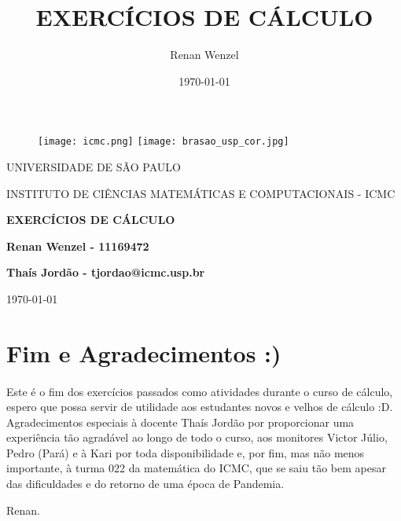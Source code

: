 \documentclass{article}
\title{EXERC\'ICIOS DE C\'ALCULO}
\author{Renan Wenzel}
\date{\today}
\begin{document}
\begin{figure}[ht]
		\texttt{[image: icmc.png]}
		\hspace{5cm}
		\texttt{[image: brasao\_usp\_cor.jpg]}
	\endminipage	
\end{figure}

\begin{center}
	\vspace{1cm}
	\LARGE
	UNIVERSIDADE DE S\~AO PAULO

	\vspace{1.3cm}
	\LARGE
	INSTITUTO DE CI\^ENCIAS MATEM\'ATICAS E COMPUTACIONAIS - ICMC

	\vspace{1.7cm}
	\Large
	\textbf{EXERC\'ICIOS DE C\'ALCULO}

	\vspace{1.3cm}
	\large
	\textbf{Renan Wenzel - 11169472}

	\vspace{1.3cm}
	\large
	\textbf{Tha\'is Jord\~ao - tjordao@icmc.usp.br}

	\vspace{1.3cm}
	\today
\end{center}

\newpage

\tableofcontents











\section{Fim e Agradecimentos :)}
\paragraph{} Este \'e o fim dos exerc\'icios passados como atividades durante o curso de c\'alculo, espero que 
possa servir de utilidade aos estudantes novos e velhos de c\'alculo :D. Agradecimentos especiais \`a docente 
Tha\'is Jord\~ao por proporcionar uma experi\^encia t\~ao agrad\'avel ao longo de todo o curso, aos monitores 
Victor J\'ulio, Pedro (Par\'a) e \`a Kari por toda disponibilidade e, por fim, mas n\~ao menos importante, \`a 
turma 022 da matem\'atica do ICMC, que se saiu t\~ao bem apesar das dificuldades e do retorno de uma \'epoca de Pandemia.

Renan. 
\end{document}

